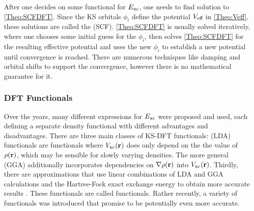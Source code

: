 \documentclass[8.5pt,twoside,twocolumn]{article}
\renewcommand\r{\bo r}
\theoremstyle{standard}
\begin{document}
After one decides on some functional for $E_{\text{xc}}$, one needs to find  solution
to \eqref{Theo:SCFDFT}. Since the KS orbitals $\phi_i$ define the potential $V_{\text{eff}}$ in
\eqref{Theo:Veff}, these solutions are called the  (SCF). 
\eqref{Theo:SCFDFT} is usually solved iteratively, where one chooses some initial guess
for the $\phi_i$, then solves \eqref{Theo:SCFDFT} for the resulting effective potential
and uses the new $\phi_i$ to establish a new potential until convergence is reached.
There are numerous techniques like damping and orbital shifts to support the
convergence, however there is no mathematical guarantee for it. 


\subsubsection{DFT Functionals}
\label{Sec:Theo:Functionals}
Over the years, many different expressions for $E_{\text{xc}}$ were proposed and used, each
defining a separate density functional with different advantages and disadvantages. There
are three main classes of KS-DFT functionals:  (LDA) functionals
are functionals where $\vxc(\r)$ does only depend on the the value of $\rho(\r)$, which may
be sensible for slowly varying densities. The more general 
(GGA) additionally incorporates dependencies on $\nabla\rho(\r)$ into $\vxc(\r)$. Thirdly,
there are approximations that use linear combinations of LDA and GGA calculations and the
Hartree-Fock exact exchange energy to obtain more accurate results \cite{Becke1993}. 
These functionals are called  functionals. Rather recently, a variety of
 functionals was introduced that promise to be potentially even more accurate.
\end{document}
